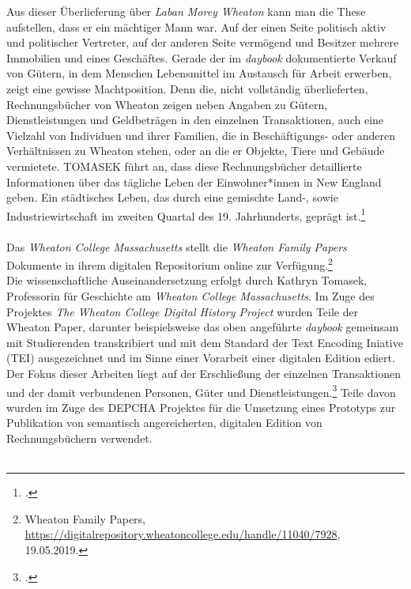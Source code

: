 \documentclass[12pt,a4paper]{article}
\begin{document}
Aus dieser Überlieferung über \textit{Laban Morey Wheaton} kann man die These aufstellen, dass er ein mächtiger Mann war. Auf der einen Seite politisch aktiv und politischer Vertreter, auf der anderen Seite vermögend und Besitzer mehrere Immobilien und eines Geschäftes. Gerade der im \textit{daybook} dokumentierte Verkauf von Gütern, in dem Menschen Lebensmittel im Austausch für Arbeit erwerben, zeigt eine gewisse Machtposition. Denn die, nicht vollständig überlieferten, Rechnungsbücher von Wheaton zeigen neben Angaben zu Gütern, Dienstleistungen und Geldbeträgen in den einzelnen Transaktionen, auch eine Vielzahl von Individuen und ihrer Familien, die in Beschäftigungs- oder anderen Verhältnissen zu Wheaton stehen, oder an die er Objekte, Tiere und Gebäude vermietete. TOMASEK führt an, dass diese Rechnungsbücher detaillierte Informationen über das tägliche Leben der Einwohner*innen in New England geben. Ein städtisches Leben, das durch eine gemischte Land-, sowie Industriewirtschaft im zweiten Quartal des 19. Jahrhunderts, geprägt ist.\footcite[][S.5]{tomasekmedea}
\\
\\
Das \textit{Wheaton College Massachusetts} stellt die \textit{Wheaton Family Papers} Dokumente in ihrem digitalen Repositorium online zur Verfügung.\footnote{Wheaton Family Papers, \url{https://digitalrepository.wheatoncollege.edu/handle/11040/7928}, 19.05.2019.} 
\\
Die wissenschaftliche Auseinandersetzung erfolgt durch Kathryn Tomasek, Professorin für Geschichte am \textit{Wheaton College Massachusetts}. Im Zuge des Projektes \textit{The Wheaton College Digital History Project} wurden Teile der Wheaton Paper, darunter beispielsweise das oben angeführte \textit{daybook} gemeinsam mit Studierenden transkribiert und mit dem Standard der Text Encoding Iniative (TEI) ausgezeichnet und im Sinne einer Vorarbeit einer digitalen Edition ediert. Der Fokus dieser Arbeiten liegt auf der Erschließung der einzelnen Transaktionen und der damit verbundenen Personen, Güter und Dienstleistungen.\footcite[Vgl. TOMASEK Kathryn: The Wheaton College Digital History Project: Undergraduate Research in a Local Collection, \protect\url{https://writinghistory.trincoll.edu/teach/wheaton-college-digital-history-project-tomasek/}, 23.05.2019.][S.379]{alexander2012should} Teile davon wurden im Zuge des DEPCHA Projektes für die Umsetzung eines Prototyps zur Publikation von semantisch angereicherten, digitalen Edition von Rechnungsbüchern verwendet.
\\
\\
\end{document}
